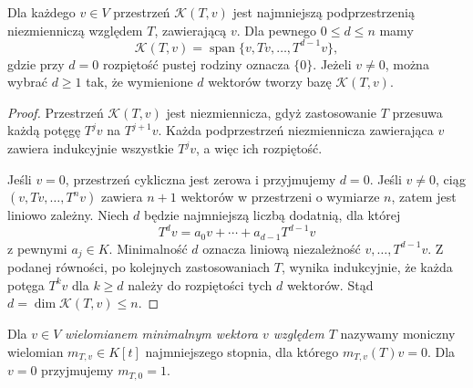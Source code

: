 \begin{stwierdzenie}
\label{prop:lin16-cyclic-smallest}
Dla każdego \(v\in V\)
przestrzeń \(\mathcal K(T,v)\)
jest najmniejszą podprzestrzenią
niezmienniczą względem \(T\), zawierającą \(v\).
Dla pewnego \(0\le d\le n\) mamy
\[
 \mathcal K(T,v)=
 \operatorname{span}\{v,Tv,\ldots,T^{d-1}v\},
\]
gdzie przy \(d=0\) rozpiętość pustej
rodziny oznacza \(\{0\}\).
Jeżeli \(v\ne0\), można wybrać \(d\ge1\)
tak, że wymienione \(d\) wektorów
tworzy bazę \(\mathcal K(T,v)\).
\end{stwierdzenie}
\begin{proof}
Przestrzeń \(\mathcal K(T,v)\) jest niezmiennicza,
gdyż zastosowanie \(T\) przesuwa każdą
potęgę \(T^jv\) na \(T^{j+1}v\).
Każda podprzestrzeń niezmiennicza
zawierająca \(v\) zawiera indukcyjnie
wszystkie \(T^jv\), a więc ich rozpiętość.

Jeśli \(v=0\), przestrzeń cykliczna jest zerowa
i przyjmujemy \(d=0\).
Jeśli \(v\ne0\), ciąg
\((v,Tv,\ldots,T^nv)\)
zawiera \(n+1\) wektorów w przestrzeni
o wymiarze \(n\), zatem jest liniowo zależny.
Niech \(d\) będzie najmniejszą liczbą dodatnią,
dla której
\[
 T^dv=a_0v+\cdots+a_{d-1}T^{d-1}v
\]
z pewnymi \(a_j\in K\).
Minimalność \(d\) oznacza liniową
niezależność \(v,\ldots,T^{d-1}v\).
Z podanej równości, po kolejnych zastosowaniach
\(T\), wynika indukcyjnie,
że każda potęga \(T^kv\) dla \(k\ge d\)
należy do rozpiętości tych \(d\) wektorów.
Stąd \(d=\dim\mathcal K(T,v)\le n\).
\end{proof}

\begin{definicja}
\label{def:lin16-vector-minpoly}
Dla \(v\in V\) \emph{wielomianem minimalnym
wektora \(v\) względem \(T\)}
nazywamy moniczny wielomian \(m_{T,v}\in K[t]\)
najmniejszego stopnia, dla którego
\(m_{T,v}(T)v=0\).
Dla \(v=0\) przyjmujemy \(m_{T,0}=1\).
\end{definicja}

